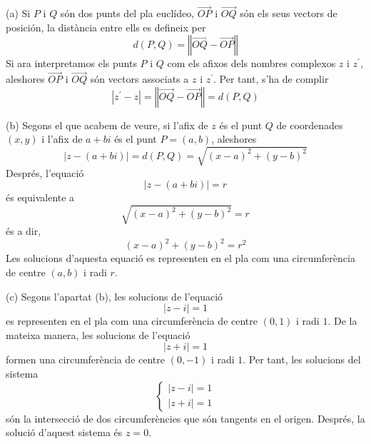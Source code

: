 \begin{solucio}
(a) Si $P$ i $Q$ són dos punts del pla euclídeo, $\overrightarrow{OP}
$ i $\overrightarrow{OQ}$ són els seus vectors de posición, la distància
entre ells es defineix per
\begin{equation*}
d(P,Q)=\left\Vert \overrightarrow{OQ}-\overrightarrow{OP}\right\Vert
\end{equation*}
Si ara interpretamos els punts $P$ i $Q$ com els afixos dels nombres complexos $z$ i $z^{\prime }$, aleshores $\overrightarrow{OP}$ i $
\overrightarrow{OQ}$ són vectors associats a $z$ i $z^{\prime }$. Per
tant, s’ha de complir
\begin{equation*}
\left\vert z^{\prime }-z\right\vert =\left\Vert \overrightarrow{OQ}-
\overrightarrow{OP}\right\Vert =d(P,Q)
\end{equation*}

(b) Segons el que acabem de veure, si l’afix de $z$ és el punt $Q$ de
coordenades $(x,y)$ i l’afix de $a+bi$ és el punt $P=(a,b)$, aleshores
\begin{equation*}
\left\vert z-(a+bi)\right\vert =d(P,Q)=\sqrt{(x-a)^{2}+(y-b)^{2}}
\end{equation*}
Després, l’equació
\begin{equation*}
\left\vert z-(a+bi)\right\vert =r
\end{equation*}
és equivalente a
\begin{equation*}
\sqrt{(x-a)^{2}+(y-b)^{2}}=r
\end{equation*}
és a dir,
\begin{equation*}
(x-a)^{2}+(y-b)^{2}=r^{2}
\end{equation*}
Les solucions d’aquesta equació es representen en el pla com una
circumferència de centre $(a,b)$ i radi $r$.

(c) Segons l’apartat (b), les solucions de l’equació
\begin{equation*}
\left\vert z-i\right\vert =1
\end{equation*}
es representen en el pla com una circumferència de centre $(0,1)$ i radi
$1$. De la mateixa manera, les solucions de l’equació
\begin{equation*}
\left\vert z+i\right\vert =1
\end{equation*}
formen una circumferència de centre $(0,-1)$ i radi $1$. Per tant, les
solucions del sistema
\begin{equation*}
\left\{
\begin{array}{l}
\left\vert z-i\right\vert =1 \\
\left\vert z+i\right\vert =1
\end{array}
\right.
\end{equation*}
són la intersecció de dos circumferències que són tangents en el
origen. Després, la solució d’aquest sistema és $z=0$.
\end{solucio}

